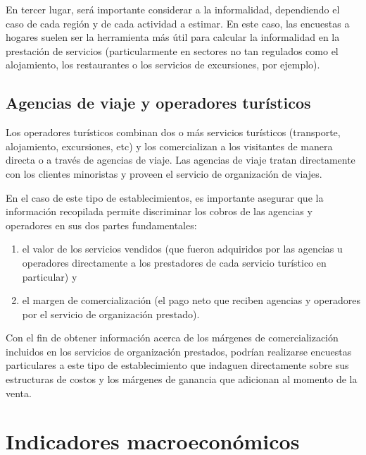 \documentclass[
  openany]{book}
\begin{document}
En tercer lugar, será importante considerar a la informalidad, dependiendo el caso de cada región y de cada actividad a estimar. En este caso, las encuestas a hogares suelen ser la herramienta más útil para calcular la informalidad en la prestación de servicios (particularmente en sectores no tan regulados como el alojamiento, los restaurantes o los servicios de excursiones, por ejemplo).

\hypertarget{agencias-de-viaje-y-operadores-turisticos}{%
\subsection{Agencias de viaje y operadores turísticos}\label{agencias-de-viaje-y-operadores-turisticos}}

Los operadores turísticos combinan dos o más servicios turísticos (transporte, alojamiento, excursiones, etc) y los comercializan a los visitantes de manera directa o a través de agencias de viaje. Las agencias de viaje tratan directamente con los clientes minoristas y proveen el servicio de organización de viajes.

En el caso de este tipo de establecimientos, es importante asegurar que la información recopilada permite discriminar los cobros de las agencias y operadores en sus dos partes fundamentales:

\begin{enumerate}
\def\labelenumi{\arabic{enumi}.}
\item
  el valor de los servicios vendidos (que fueron adquiridos por las agencias u operadores directamente a los prestadores de cada servicio turístico en particular) y
\item
  el margen de comercialización (el pago neto que reciben agencias y operadores por el servicio de organización prestado).
\end{enumerate}

Con el fin de obtener información acerca de los márgenes de comercialización incluidos en los servicios de organización prestados, podrían realizarse encuestas particulares a este tipo de establecimiento que indaguen directamente sobre sus estructuras de costos y los márgenes de ganancia que adicionan al momento de la venta.

\hypertarget{indicadores-macroeconuxf3micos}{%
\section{Indicadores macroeconómicos}\label{indicadores-macroeconuxf3micos}}
\end{document}

